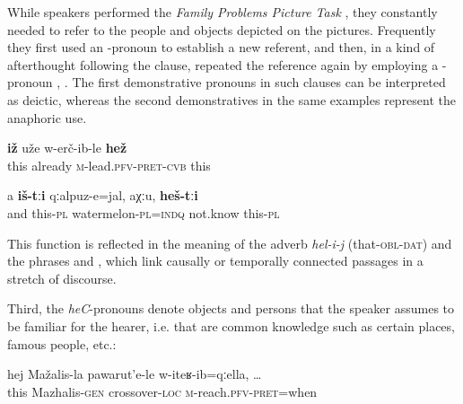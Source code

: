 While speakers performed the \textit{Family Problems Picture Task} \citep{SanRoqueEtAl2012}, they constantly needed to refer to the people and objects depicted on the pictures. Frequently they first used an -pronoun to establish a new referent, and then, in a kind of afterthought following the clause, repeated the reference again by employing a -pronoun , . The first demonstrative pronouns in such clauses can be interpreted as deictic, whereas the second demonstratives in the same examples represent the anaphoric use.  
%
\begin{exe}
	\ex	\label{They already carried him away}
	\gll	\textbf{iž}	uže	w-erč-ib-le	\textbf{hež} \\
		this	already	\textsc{m}-lead.\textsc{pfv}-\textsc{pret}-\textsc{cvb}	this\\
	\glt	{}
	
	\ex	\label{and these are watermelons, I don't know, these}
	\gll	a	\textbf{iš-tːi}	qːalpuz-e=jal,	aχːu,	\textbf{heš-tːi} \\
		and	this-\textsc{pl}	watermelon-\textsc{pl}=\textsc{indq}	not.know	this-\textsc{pl}\\
	\glt 	{}
\end{exe}


This function is reflected in the meaning of the adverb \textit{hel-i-j} (that-\textsc{obl}-\textsc{dat})  and the phrases   and  , which link causally or temporally connected passages in a stretch of discourse.

Third, the \textit{heC}-pronouns denote objects and persons that the speaker assumes to be familiar for the hearer, i.e. that are common knowledge such as certain places, famous people, etc.:
%
\begin{exe}
	\ex	\label{when I reached the crossover of Mazhalis}
	\gll	hej	Mažalis-la	pawarut'e-le	w-iteʁ-ib=qːella, \ldots\\
		this	Mazhalis-\textsc{gen}	crossover-\textsc{loc}	\textsc{m}-reach.\textsc{pfv}-\textsc{pret}=when\\
	\glt	{}
\end{exe}

